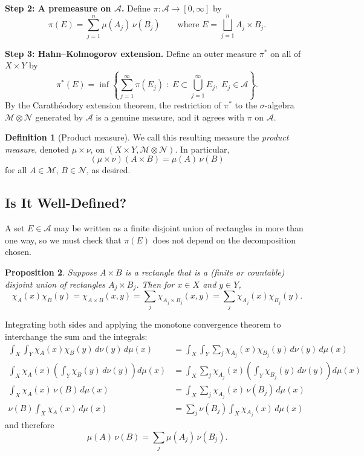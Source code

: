 \documentclass[11pt]{article}
\theoremstyle{definition}
\newtheorem{definition}{Definition}[section]
\theoremstyle{plain}
\newtheorem{proposition}[definition]{Proposition}
\newcommand{\M}{\mathcal{M}}
\newcommand{\N}{\mathcal{N}}
\newcommand{\A}{\mathcal{A}}
\begin{document}
\medskip
\noindent
\textbf{Step 2: A premeasure on $\A$.} Define
$\pi : \A \to [0,\infty]$ by
\[
  \pi(E) = \sum_{j=1}^{n} \mu(A_j)\,\nu(B_j)
  \qquad \text{where } E = \bigsqcup_{j=1}^{n} A_j \times B_j.
\]

\medskip
\noindent
\textbf{Step 3: Hahn--Kolmogorov extension.} Define an outer measure
$\pi^{*}$ on all of $X \times Y$ by
\[
  \pi^{*}(E) = \inf\left\{ \sum_{j=1}^{\infty} \pi(E_j)
    \;:\; E \subset \bigcup_{j=1}^{\infty} E_j, \; E_j \in \A \right\}.
\]
By the Carath\'eodory extension theorem, the restriction of $\pi^{*}$
to the $\sigma$-algebra $\M \otimes \N$ generated by $\A$ is a genuine
measure, and it agrees with $\pi$ on $\A$.

\begin{definition}[Product measure]
We call this resulting measure the \emph{product measure}, denoted
$\mu \times \nu$, on $(X \times Y, \M \otimes \N)$. In particular,
\[
  (\mu \times \nu)(A \times B) = \mu(A)\,\nu(B)
\]
for all $A \in \M$, $B \in \N$, as desired.
\end{definition}

\subsection{Is It Well-Defined?}

A set $E \in \A$ may be written as a finite disjoint union of
rectangles in more than one way, so we must check that $\pi(E)$ does
not depend on the decomposition chosen.

\begin{proposition}
Suppose $A \times B$ is a rectangle that is a (finite or countable)
disjoint union of rectangles $A_j \times B_j$. Then for $x \in X$ and
$y \in Y$,
\[
  \chi_A(x)\chi_B(y) = \chi_{A \times B}(x,y)
    = \sum_j \chi_{A_j \times B_j}(x,y)
    = \sum_j \chi_{A_j}(x)\chi_{B_j}(y).
\]
\end{proposition}

Integrating both sides and applying the monotone convergence theorem to
interchange the sum and the integrals:
\begin{align*}
  \int_X \int_Y \chi_A(x)\chi_B(y) \,d\nu(y)\,d\mu(x)
    &= \int_X \int_Y \sum_j \chi_{A_j}(x)\chi_{B_j}(y) \,d\nu(y)\,d\mu(x) \\[4pt]
  \int_X \chi_A(x) \left( \int_Y \chi_B(y) \,d\nu(y) \right) d\mu(x)
    &= \int_X \sum_j \chi_{A_j}(x)
       \left( \int_Y \chi_{B_j}(y) \,d\nu(y) \right) d\mu(x) \\[4pt]
  \int_X \chi_A(x)\,\nu(B) \,d\mu(x)
    &= \int_X \sum_j \chi_{A_j}(x)\,\nu(B_j) \,d\mu(x) \\[4pt]
  \nu(B) \int_X \chi_A(x) \,d\mu(x)
    &= \sum_j \nu(B_j) \int_X \chi_{A_j}(x) \,d\mu(x)
\end{align*}
and therefore
\[
  \boxed{\; \mu(A)\,\nu(B) = \sum_j \mu(A_j)\,\nu(B_j). \;}
\]
\end{document}

